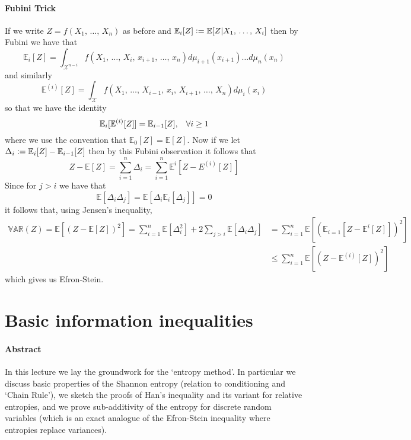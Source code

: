 \documentclass{amsproc}
\newcommand{\defeq}{\vcentcolon=} %
\newcommand{\E}{\mathbb{E}} %
\newcommand{\var}{\mathbb{VAR}} %
\begin{document}
\paragraph{\textbf{Fubini Trick}}
\label{rmk:Fubini}
	If we write $Z = f(X_1,\,\dots,\,X_n)$ as before and 
	$\E_i[Z] \defeq \E[Z|X_1,\,\dots,\,X_i]$ then by Fubini we have that 
	$$\E_i[Z] = \int_{\mathcal{X}^{n-i}} f(X_1,\,\dots,\,X_i,\,x_{i+1},\,\dots,\,x_{n})d\mu_{i+1}(x_{i+1})\dots d\mu_n(x_{n})$$ and similarly
	$$\E^{(i)}[Z] = \int_\mathcal{X} f(X_1,\,\dots,\,X_{i-1},\,x_i,\,X_{i+1},\,\dots,\,X_n)d\mu_i(x_i)$$ so that we have the identity
	$$\E_i[\E^{(i)}[Z]] = \E_{i-1}[Z], \hspace{0.3 cm} \forall i \geq 1$$
	where we use the convention that $\E_0[Z] = \E[Z]$. Now if we let $\Delta_i \defeq \E_i[Z] - \E_{i-1}[Z]$ then by this Fubini observation it follows that 
	$$Z - \E[Z] = \sum\limits_{i=1}^n \Delta_i = \sum\limits_{i=1}^n \E^i[Z - E^{(i)}[Z]]$$ 
	Since for $j > i$ we have that
	$$\E[\Delta_i\Delta_j] = \E[\Delta_i\E_i[\Delta_j]] = 0$$ it follows that, using Jensen's inequality,
	\begin{align*}
		\var(Z)
		= \E[(Z-\E[Z])^2]
		= \sum\limits_{i=1}^n \E[\Delta_i^2] + 2\sum\limits_{j>i}\E[\Delta_i\Delta_j]
		&= \sum\limits_{i=1}^n \E[(\E_{i=1}[Z - \E^{i}[Z]])^2]\\
		&\leq\sum\limits_{i=1}^n \E[(Z - \E^{(i)}[Z])^2]
	\end{align*}
	which gives us Efron-Stein.  


\section{Basic information inequalities}
\label{sec:bas_inf_ineq}
\paragraph{\textbf{Abstract}}
	In this lecture we lay the groundwork for the `entropy method'.
	In particular we discuss basic properties of the Shannon entropy (relation to conditioning and `Chain Rule'),
	we sketch the proofs of Han's inequality and its variant for relative entropies,
	and we prove sub-additivity of the entropy for discrete random variables
	(which is an exact analogue of the Efron-Stein inequality where entropies replace variances).
\end{document}
